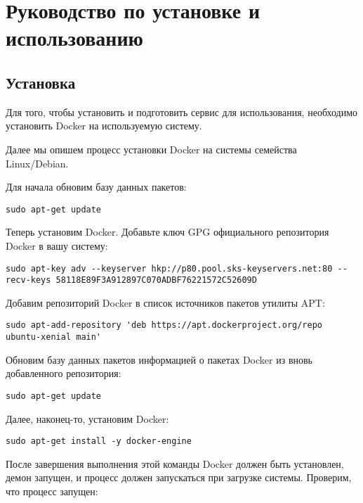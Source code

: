 \section{Руководство по установке и использованию}
\label{sec:manual}

\subsection{Установка}
\label{sec:manual:install}

Для того, чтобы установить и подготовить сервис для использования, необходимо установить Docker на используемую систему.

Далее мы опишем процесс установки Docker на системы семейства Linux/Debian.

Для начала обновим базу данных пакетов:

\begin{lstlisting}
sudo apt-get update
\end{lstlisting}

Теперь установим Docker. Добавьте ключ GPG официального репозитория Docker в вашу систему:

\begin{lstlisting}
sudo apt-key adv --keyserver hkp://p80.pool.sks-keyservers.net:80 --recv-keys 58118E89F3A912897C070ADBF76221572C52609D
\end{lstlisting}

Добавим репозиторий Docker в список источников пакетов утилиты APT:

\begin{lstlisting}
sudo apt-add-repository 'deb https://apt.dockerproject.org/repo ubuntu-xenial main'
\end{lstlisting}

Обновим базу данных пакетов информацией о пакетах Docker из вновь добавленного репозитория:

\begin{lstlisting}
sudo apt-get update
\end{lstlisting}

Далее, наконец-то, установим Docker:

\begin{lstlisting}
sudo apt-get install -y docker-engine
\end{lstlisting}

После завершения выполнения этой команды Docker должен быть установлен, демон запущен, и процесс должен запускаться при загрузке системы. Проверим, что процесс запущен:

